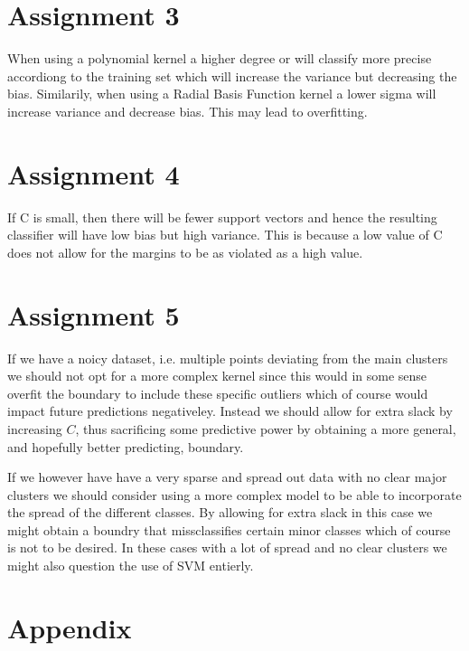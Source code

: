 \documentclass{article}
\begin{document}
\section*{Assignment 3}

When using a polynomial kernel a higher degree or will classify more precise accordiong to the training set which will increase 
the variance but decreasing the bias. 
Similarily, when using a Radial Basis Function kernel a lower sigma will increase variance and decrease bias. 
This may lead to overfitting. 

\section*{Assignment 4}

If C is small, then there will be fewer support vectors and hence the resulting classifier will have low bias but
high variance. This is because a low value of C does not allow for the margins to be as violated as a high value. 

\section*{Assignment 5}

If we have a noicy dataset, i.e. multiple points deviating from the main clusters we should not opt for a more complex kernel since this would in some sense overfit the boundary to include these specific outliers which of course would impact future predictions negativeley. Instead we should allow for extra slack by increasing $C$, thus sacrificing some predictive power by obtaining a more general, and hopefully better predicting, boundary. 

If we however have have a very sparse and spread out data with no clear major clusters we should consider using a more complex model to be able to incorporate the spread of the different classes. By allowing for extra slack in this case we might obtain a boundry that missclassifies certain minor classes which of course is not to be desired. In these cases with a lot of spread and no clear clusters we might also question the use of SVM entierly.

\section*{Appendix}
\end{document}
